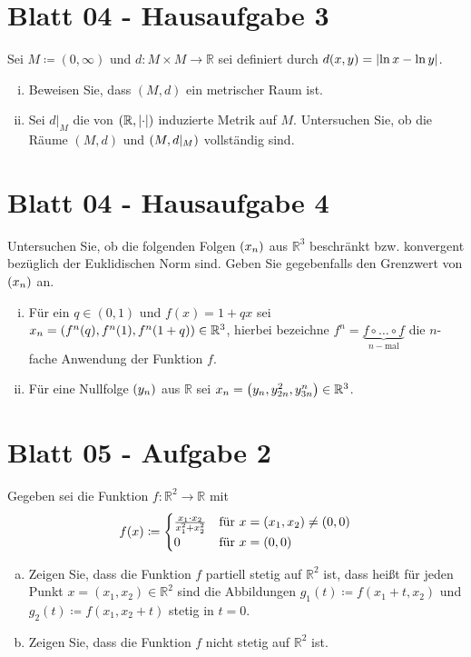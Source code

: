 \documentclass{scrreprt}
\begin{document}
\section{Blatt 04 - Hausaufgabe 3}

Sei $M \coloneqq (0, \infty)$ und $d \colon M \times M \to \mathbb{R}$ sei definiert durch
$d(x, y) = \abs{\ln x - \ln y}$.

\begin{enumerate}[(i)]
\item Beweisen Sie, dass $(M, d)$ ein metrischer Raum ist.
\item Sei $d|_M$ die von $(\mathbb{R}, \abs{\cdot})$ induzierte Metrik auf $M$.
  Untersuchen Sie, ob die Räume $(M, d)$ und $\qty(M, d|_M)$ vollständig sind. \\
\end{enumerate}

\section{Blatt 04 - Hausaufgabe 4}

Untersuchen Sie, ob die folgenden Folgen $\qty(x_n)$ aus $\mathbb{R}^3$ beschränkt bzw.
konvergent bezüglich der Euklidischen Norm sind.
Geben Sie gegebenfalls den Grenzwert von $\qty(x_n)$ an.

\begin{enumerate}[(i)]
\item Für ein $q \in (0, 1)$ und $f(x) = 1 + qx$ sei
  $x_n = \qty(f^n(q), f^n(1), f^n(1 + q)) \in \mathbb{R}^3$, hierbei bezeichne
  $f^n = \underset{n-\text{mal}}{\underbrace{f \circ \ldots \circ f}}$ die $n$-fache
  Anwendung der Funktion $f$.

\item Für eine Nullfolge $\qty(y_n)$ aus $\mathbb{R}$ sei
  $x_n = \qty(y_n, y_{2n}^2, y_{3n}^n) \in \mathbb{R}^3$.
\end{enumerate}

\section{Blatt 05 - Aufgabe 2}

Gegeben sei die Funktion $f \colon \mathbb{R}^2 \to \mathbb{R}$ mit
\[
  f(x) \coloneqq \begin{cases}
    \frac{x_1 \cdot x_2}{x_1^2 + x_2^2} & \text{für } x = \qty(x_1, x_2) \ne (0, 0) \\
    0 & \text{für } x = (0, 0)
  \end{cases}
\]
\begin{enumerate}[a)]
\item Zeigen Sie, dass die Funktion $f$ partiell stetig auf $\mathbb{R}^2$ ist,
  dass heißt für jeden Punkt $x = (x_1, x_2) \in \mathbb{R}^2$ sind die
  Abbildungen $g_1(t) \coloneqq f(x_1 + t, x_2)$ und
  $g_2(t) \coloneqq f(x_1, x_2 + t)$ stetig in $t = 0$.
\item Zeigen Sie, dass die Funktion $f$ nicht stetig auf $\mathbb{R}^2$ ist.
\end{enumerate}
\end{document}
